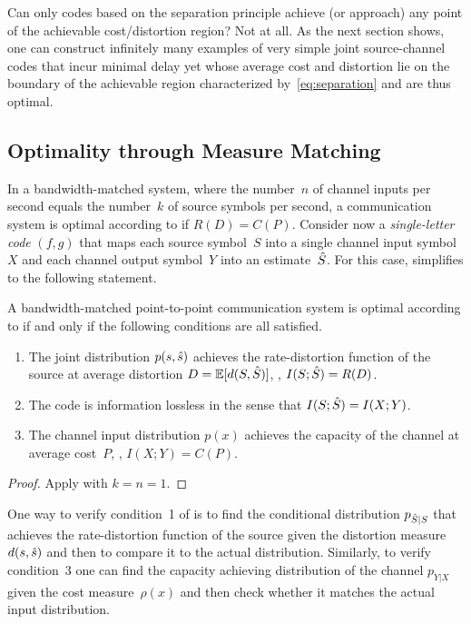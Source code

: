 Can only codes based on the separation principle achieve (or approach) any point
of the achievable cost\slash distortion region? Not at all. As the next section
shows, one can construct infinitely many examples of very simple joint
source-channel codes that incur minimal delay yet whose average cost and
distortion lie on the boundary of the achievable region characterized
by~\eqref{eq:separation} and are thus optimal. 


\subsection{Optimality through Measure Matching}
\label{sec:measurematching}

In a bandwidth-matched system, where the number~$n$ of channel inputs per second
equals the number~$k$ of source symbols per second, a communication system is
optimal according to  if $R(D) = C(P)$. Consider now a
\emph{single-letter code} $(f, g)$ that maps each source symbol~$S$ into a
single channel input symbol~$X$ and each channel output symbol~$Y$ into an
estimate~${\hat{S}}$. For this case,  simplifies to the
following statement.

\begin{theorem}
  \label{thm:sloptimality}
  A bandwidth-matched point-to-point communication system is optimal according
  to  if and only if the following conditions are all
  satisfied.
  \begin{enumerate}
    \item The joint distribution $p(s,{\hat{s}})$ achieves the rate-distortion
      function of the source at average distortion $D = \mathbb{E}[d(S,{\hat{S}})]$, \ie,
      $I(S;{\hat{S}}) = R(D)$.

    \item The code is information lossless in the sense that $I(S;{\hat{S}}) =
      I(X;Y)$. 

    \item The channel input distribution $p(x)$ achieves the capacity of the
      channel at average cost~$P$, \ie, $I(X;Y) = C(P)$. 
  \end{enumerate}
\end{theorem}

\begin{proof}
  Apply  with $k = n = 1$.
\end{proof}

One way to verify condition~1 of  is to find the
conditional distribution $p_{{\hat{S}}|S}$ that achieves the rate-distortion function
of the source given the distortion measure~$d(s,{\hat{s}})$ and then to compare it to
the actual distribution. Similarly, to verify condition~3 one can find the
capacity achieving distribution of the channel $p_{Y|X}$ given the cost
measure~$\rho(x)$ and then check whether it matches the actual input
distribution.

